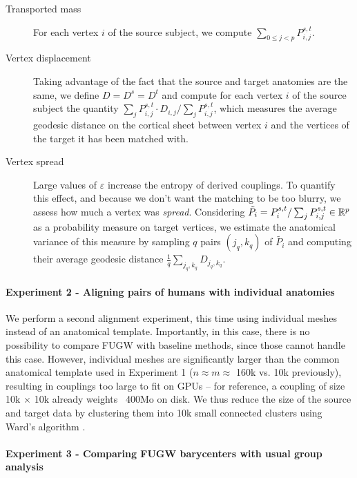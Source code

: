 \begin{description}
    \item[Transported mass]
    For each vertex $i$ of the source subject, we compute
    $\sum \limits_{0 \leq j < p} P^{s,t}_{i, j}$.

    \item[Vertex displacement]
    Taking advantage of the fact that the source and target anatomies are the same,
    we define $D = D^s = D^t$ and compute for each vertex $i$ of the source subject the quantity
    $\sum_j P^{s,t}_{i, j} \cdot D_{i, j} / \sum_j P^{s,t}_{i,j}$,
    which measures the average geodesic distance on the cortical sheet between vertex $i$
    and the vertices of the target it has been matched with.

    \item[Vertex spread]
    Large values of $\varepsilon$ increase the entropy of derived couplings.
    To quantify this effect, and because we don't want the matching to be too blurry,
    we assess how much a vertex was \textit{spread}. Considering
    $\tilde{P_i} = P^{s,t}_i / \sum_j P^{s,t}_{i,j} \in \mathbb R^p$
    as a probability measure on target vertices,
    we estimate the anatomical variance of this measure by sampling $q$ pairs
    $(j_q, k_q)$ of $\tilde{P_i}$ and computing their average geodesic distance
    $\frac{1}{q} \sum\limits_{j_q, k_q} D_{j_q, k_q}$.
\end{description}

\paragraph{Experiment 2 - Aligning pairs of humans with individual anatomies}
We perform a second alignment experiment, this time using individual meshes instead of
an anatomical template. Importantly, in this case,  there is no possibility to compare
FUGW with baseline methods, since those cannot handle this case.
However, individual meshes are significantly larger than the
common anatomical template used in Experiment 1 ($n \approx m \approx$ 160k vs. 10k previously),
resulting in couplings too large to fit on GPUs -- for reference,
a coupling of size 10k $\times$ 10k already weights ~400Mo on disk.
We thus reduce the size of the source and target data by
clustering them into 10k small connected clusters using Ward's algorithm \citep{thirion:2014}.

\paragraph{Experiment 3 - Comparing FUGW barycenters with usual group analysis}
\label{par:barycenter}

